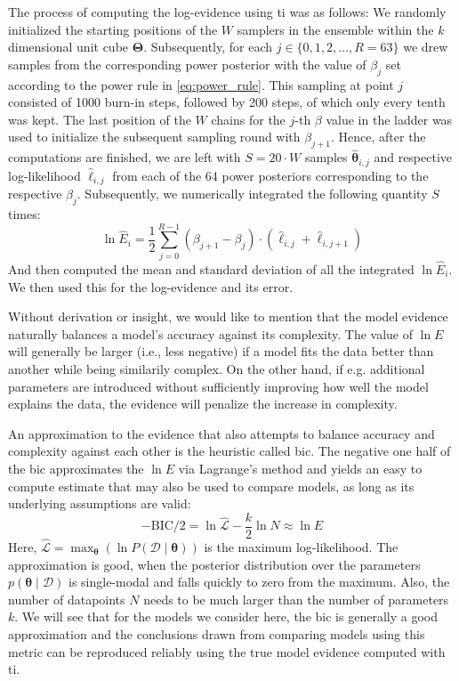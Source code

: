 \documentclass[twocolumn]{aastex631}
\begin{document}
The process of computing the log-evidence using \gls{ti} was as follows: We randomly initialized the starting positions of the $W$ samplers in the ensemble within the $k$ dimensional unit cube $\boldsymbol{\Theta}$. Subsequently, for each $j \in \{ 0, 1, 2, \ldots, R=63 \}$ we drew samples from the corresponding power posterior with the value of $\beta_j$ set according to the power rule in \cref{eq:power_rule}. This sampling at point $j$ consisted of 1000 burn-in steps, followed by 200 steps, of which only every tenth was kept. The last position of the $W$ chains for the $j$-th $\beta$ value in the ladder was used to initialize the subsequent sampling round with $\beta_{j+1}$. Hence, after the computations are finished, we are left with $S = 20 \cdot W$ samples $\boldsymbol{\hat{\theta}}_{i,j}$ and respective log-likelihood $\hat{\ell}_{i,j}$ from each of the 64 power posteriors corresponding to the respective $\beta_j$. Subsequently, we numerically integrated the following quantity $S$ times:
%
\begin{equation}
    \ln \hat{E}_i = \frac{1}{2} \sum_{j=0}^{R-1} \left( \beta_{j+1} - \beta_j \right) \cdot \left( \hat{\ell}_{i,j} + \hat{\ell}_{i,j+1} \right)
\end{equation}
%
And then computed the mean and standard deviation of all the integrated $\ln \hat{E}_i$. We then used this for the log-evidence and its error.

Without derivation or insight, we would like to mention that the model evidence naturally balances a model's accuracy against its complexity. The value of $\ln E$ will generally be larger (i.e., less negative) if a model fits the data better than another while being similarily complex. On the other hand, if e.g. additional parameters are introduced without sufficiently improving how well the model explains the data, the evidence will penalize the increase in complexity.

An approximation to the evidence that also attempts to balance accuracy and complexity against each other is the heuristic called \gls{bic}. The negative one half of the \gls{bic} approximates the $\ln E$ via Lagrange's method \cite{bhat_derivation_2010} and yields an easy to compute estimate that may also be used to compare models, as long as its underlying assumptions are valid:
%
\begin{equation} \label{eq:bic}
    - \text{BIC} / 2 = \ln{\hat{\mathcal{L}}} - \frac{k}{2} \ln{N} \approx \ln{E}
\end{equation}
%
Here, $\hat{\mathcal{L}} = \max_{\boldsymbol{\theta}}{\left( \ln P \left( \boldsymbol{\mathcal{D}} \mid \boldsymbol{\theta} \right)\right)}$ is the maximum log-likelihood. The approximation is good, when the posterior distribution over the parameters $p\left( \boldsymbol{\theta} \mid \boldsymbol{\mathcal{D}} \right)$ is single-modal and falls quickly to zero from the maximum. Also, the number of datapoints $N$ needs to be much larger than the number of parameters $k$. We will see that for the models we consider here, the \gls{bic} is generally a good approximation and the conclusions drawn from comparing models using this metric can be reproduced reliably using the true model evidence computed with \gls{ti}.
\end{document}
